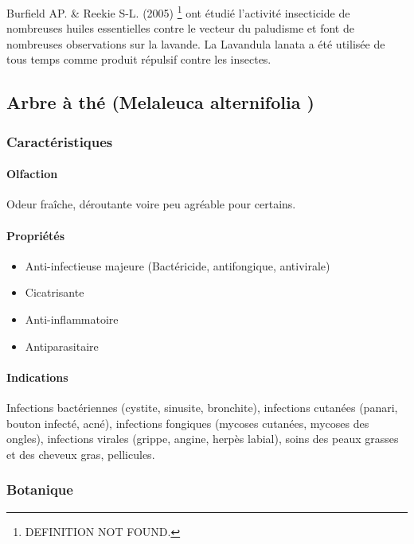 \documentclass[12pt,a4wide]{article}
\begin{document}
Burfield AP. \& Reekie S-L. (2005) \footnote{DEFINITION NOT FOUND.} ont étudié l'activité insecticide de nombreuses huiles essentielles contre le vecteur du paludisme et font de nombreuses observations sur la lavande. La Lavandula lanata a été utilisée de tous temps comme produit répulsif contre les insectes. 




\subsection{Arbre à thé (Melaleuca alternifolia )}
\label{sec-4-9}

\subsubsection{Caractéristiques}
\label{sec-4-9-1}

\paragraph{Olfaction}
\label{sec-4-9-1-1}
Odeur fraîche, déroutante voire peu agréable pour certains.

\paragraph{Propriétés}
\label{sec-4-9-1-2}

\begin{itemize}
\item Anti-infectieuse majeure (Bactéricide, antifongique, antivirale)
\item Cicatrisante
\item Anti-inflammatoire
\item Antiparasitaire
\end{itemize}

\paragraph{Indications}
\label{sec-4-9-1-3}

Infections  bactériennes  (cystite,  sinusite, bronchite),  infections  cutanées
(panari, bouton infecté, acné),  infections fongiques (mycoses cutanées, mycoses
des ongles), infections virales (grippe, angine, herpès labial), soins des peaux
grasses et des cheveux gras, pellicules.

\subsubsection{Botanique}
\label{sec-4-9-2}
\end{document}
